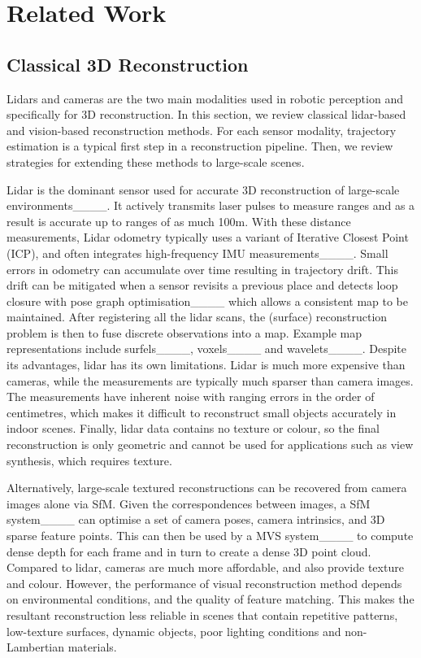 \section{Related Work}
\label{sec:related_works}

\subsection{Classical 3D Reconstruction}
Lidars and cameras are the two main modalities used in robotic perception and specifically for 3D reconstruction. In this section, we review classical lidar-based and vision-based reconstruction methods. For each sensor modality, trajectory estimation is a typical first step in a reconstruction pipeline. Then, we review strategies for extending these methods to large-scale scenes.

Lidar is the dominant sensor used for accurate 3D reconstruction of large-scale environments____. It actively transmits laser pulses to measure ranges and as a result is accurate up to ranges of as much 100m. With these distance measurements, Lidar odometry typically uses a variant of Iterative Closest Point (ICP), and often integrates high-frequency IMU measurements____. Small errors in odometry can accumulate over time resulting in trajectory drift. This drift can be mitigated when a sensor revisits a previous place and detects loop closure with pose graph optimisation____ which allows a consistent map to be maintained.
After registering all the lidar scans, the (surface) reconstruction problem is then to fuse discrete observations into a map. %
Example map representations include surfels____, voxels____ and wavelets____. 
Despite its advantages, lidar has its own limitations. Lidar is much more expensive than cameras, while the measurements are typically much sparser than camera images. The measurements have inherent noise with ranging errors in the order of centimetres, which makes it difficult to reconstruct small objects accurately in indoor scenes. Finally, lidar data contains no texture or colour, so the final reconstruction is only geometric and cannot be used for applications such as view synthesis, which requires texture.

Alternatively, large-scale textured reconstructions can be recovered from camera images alone via SfM. Given the correspondences between images, a SfM system____ can optimise a set of camera poses, camera intrinsics, and 3D sparse feature points. This can then be used by a MVS system____ to compute dense depth for each frame and in turn to create a dense 3D point cloud. Compared to lidar, cameras are much more affordable, and also provide texture and colour. However, the performance of visual reconstruction method depends on environmental conditions, and the quality of feature matching. This makes the resultant reconstruction less reliable in scenes that contain repetitive patterns, low-texture surfaces, dynamic objects, poor lighting conditions and non-Lambertian materials.

